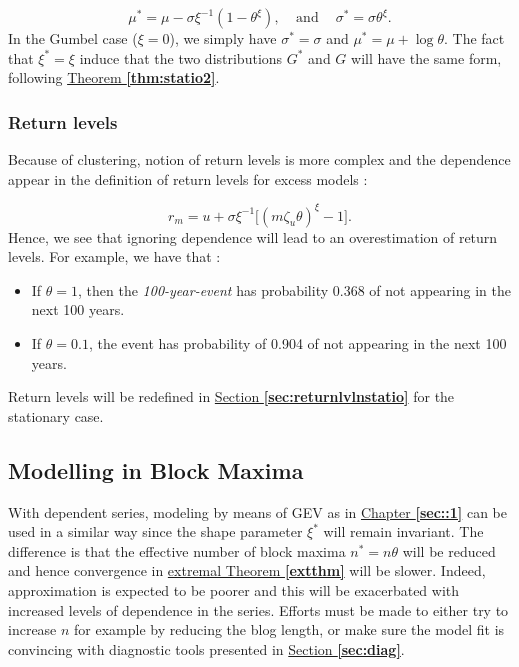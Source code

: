 \begin{equation}
\mu^* = \mu-\sigma\xi^{-1}(1-\theta^{\xi}), \ \ \ \   \ \text{and} \ \quad \sigma^*=\sigma\theta^{\xi}.
\end{equation}
In the Gumbel case ($\xi=0$), we simply have $\sigma^*=\sigma$ and $\mu^*=\mu+\log\theta$.
The fact that $\xi^*=\xi$ induce that the two distributions $G^*$ and $G$ will have the same form, following \hyperref[thm:statio2]{Theorem \textbf{\ref{thm:statio2}}}.




\subsubsection*{Return levels}

Because of clustering, notion of return levels is more complex and the dependence appear in the definition of return levels for excess models :

\begin{equation}\label{eq:rlstatio}
r_m = u + \sigma\xi^{-1}\Big[(m\zeta_u\theta)^{\xi}-1\Big].
\end{equation}
Hence, we see that ignoring dependence will lead to an overestimation of return levels. For example, we have that :

\begin{itemize}
	\item If $\theta=1$, then the \textit{100-year-event} has probability 0.368 of not appearing in the next 100 years.
	\item If $\theta=0.1$, the event has probability of 0.904 of not appearing in the next 100 years.
\end{itemize}
Return levels will be redefined in \hyperref[sec:returnlvlnstatio]{Section \textbf{\ref{sec:returnlvlnstatio}}} for the stationary case.

\subsection{Modelling in Block Maxima}

With dependent series, modeling by means of GEV as in 
\hyperref[sec::1]{Chapter \textbf{\ref{sec::1}}} can be used in 
a similar way since the shape parameter $\xi^*$ will remain invariant. The difference is that the effective number of block maxima $n^*=n\theta$ will be reduced and hence convergence in \hyperref[extthm]{extremal Theorem \textbf{\ref{extthm}}} will be slower. 
Indeed, approximation is expected to be poorer and this will be exacerbated with increased levels of dependence in the series.
Efforts must be made to either try to increase $n$ for example by reducing the blog length, or make sure the model fit is convincing with diagnostic tools presented in \hyperref[sec:diag]{Section \textbf{\ref{sec:diag}}}.


